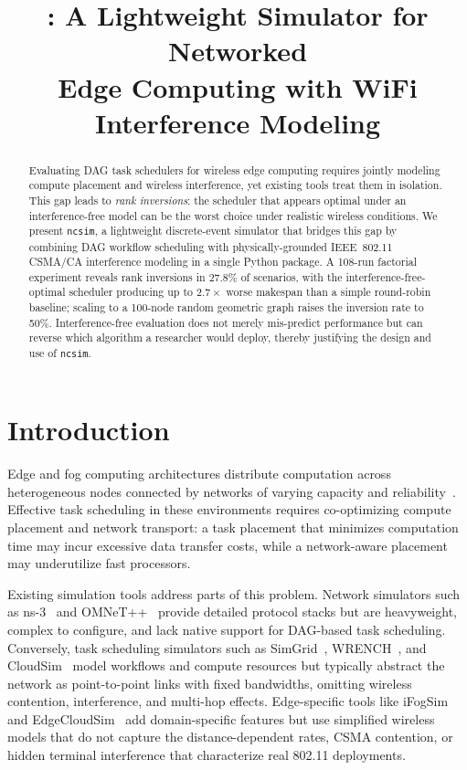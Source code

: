 \documentclass[conference]{IEEEtran}
\title{\ncsim{}: A Lightweight Simulator for Networked\\Edge Computing with WiFi Interference Modeling}
\author{
\IEEEauthorblockN{Bhaskar Krishnamachari\IEEEauthorrefmark{1},
Maya Gutierrez\IEEEauthorrefmark{1}, and
Jared Coleman\IEEEauthorrefmark{1}\IEEEauthorrefmark{2}}
\IEEEauthorblockA{\IEEEauthorrefmark{1}University of Southern California\\
bkrishna@usc.edu, mayaguti@usc.edu}
\IEEEauthorblockA{\IEEEauthorrefmark{2}Loyola Marymount University\\
jared.coleman@lmu.edu}
}
\newcommand{\ncsim}{\texttt{ncsim}}
\begin{document}
\maketitle

\begin{abstract}
Evaluating DAG task schedulers for wireless edge computing requires
jointly modeling compute placement and wireless interference, yet
existing tools treat them in isolation.  This gap leads to
\emph{rank inversions}: the scheduler that appears optimal under an
interference-free model can be the worst choice under realistic
wireless conditions.  We present \ncsim{}, a lightweight
discrete-event simulator that bridges this gap by combining DAG
workflow scheduling with physically-grounded IEEE~802.11 CSMA/CA
interference modeling in a single Python package.  A 108-run
factorial experiment reveals rank inversions in 27.8\% of scenarios,
with the interference-free-optimal scheduler producing up to
$2.7\times$ worse makespan than a simple round-robin baseline;
scaling to a 100-node random geometric graph raises the inversion
rate to 50\%.  Interference-free evaluation does not merely
mis-predict performance but can reverse which algorithm a
researcher would deploy, thereby justifying the design and use
of \ncsim{}.
\end{abstract}

\section{Introduction}
\label{sec:intro}

Edge and fog computing architectures distribute computation across
heterogeneous nodes connected by networks of varying capacity and
reliability~\cite{shi2016edge}.  Effective task scheduling in these
environments requires co-optimizing compute placement and network transport:
a task placement that minimizes computation time may incur excessive data
transfer costs, while a network-aware placement may underutilize fast
processors.

Existing simulation tools address parts of this problem.  Network simulators
such as ns-3~\cite{ns3} and OMNeT++~\cite{omnetpp} provide detailed protocol
stacks but are heavyweight, complex to configure, and lack native support for
DAG-based task scheduling.  Conversely, task scheduling simulators such as
SimGrid~\cite{simgrid}, WRENCH~\cite{wrench}, and CloudSim~\cite{cloudsim}
model workflows and compute resources but typically abstract the network as
point-to-point links with fixed bandwidths, omitting wireless contention,
interference, and multi-hop effects.  Edge-specific tools like
iFogSim~\cite{ifogsim} and EdgeCloudSim~\cite{edgecloudsim} add
domain-specific features but use simplified wireless models that do not
capture the distance-dependent rates, CSMA contention, or hidden terminal
interference that characterize real 802.11 deployments.
\end{document}
